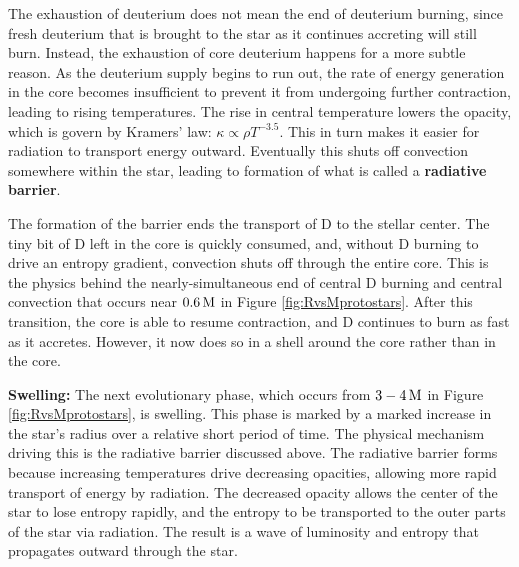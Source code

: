 \documentclass[a4paper,10pt]{article}
\begin{document}
{\noindent}The exhaustion of deuterium does not mean the end of deuterium burning, since fresh deuterium that is brought to the star as it continues accreting will still burn. Instead, the exhaustion of core deuterium happens for a more subtle reason. As the deuterium supply begins to run out, the rate of energy generation in the core becomes insufficient to prevent it from undergoing further contraction, leading to rising temperatures. The rise in central temperature lowers the opacity, which is govern by Kramers' law: $\kappa\propto\rho T^{-3.5}$. This in turn makes it easier for radiation to transport energy outward. Eventually this shuts off convection somewhere within the star, leading to formation of what is called a \textbf{radiative barrier}.

{\noindent}The formation of the barrier ends the transport of D to the stellar center. The tiny bit of D left in the core is quickly consumed, and, without D burning to drive an entropy gradient, convection shuts off through the entire core. This is the physics behind the nearly-simultaneous end of central D burning and central convection that occurs near $0.6\,{\rm M}$ in Figure \ref{fig:RvsMprotostars}. After this transition, the core is able to resume contraction, and D continues to burn as fast as it accretes. However, it now does so in a shell around the core rather than in the core.

{\noindent}\textbf{Swelling:} The next evolutionary phase, which occurs from $3-4\,{\rm M}$ in Figure \ref{fig:RvsMprotostars}, is swelling. This phase is marked by a marked increase in the star's radius over a relative short period of time. The physical mechanism driving this is the radiative barrier discussed above. The radiative barrier forms because increasing temperatures drive decreasing opacities, allowing more rapid transport of energy by radiation. The decreased opacity allows the center of the star to lose entropy rapidly, and the entropy to be transported to the outer parts of the star via radiation. The result is a wave of luminosity and entropy that propagates outward through the star.
\end{document}

